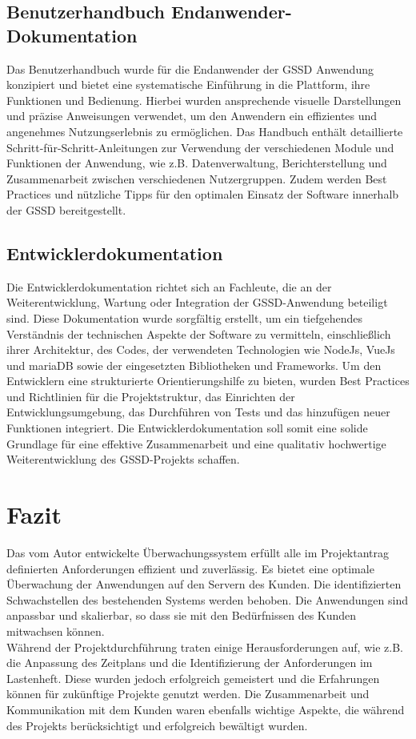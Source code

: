\begin{flushleft}
		\subsection{Benutzerhandbuch Endanwender-Dokumentation}

			Das Benutzerhandbuch wurde für die Endanwender der \acs{GSSD} Anwendung konzipiert und bietet eine systematische Einführung in die Plattform, ihre Funktionen und Bedienung. Hierbei wurden ansprechende visuelle Darstellungen und präzise Anweisungen verwendet, um den Anwendern ein effizientes und angenehmes Nutzungserlebnis zu ermöglichen. Das Handbuch enthält detaillierte Schritt-für-Schritt-Anleitungen zur Verwendung der verschiedenen Module und Funktionen der Anwendung, wie \acs{z.B.} Datenverwaltung, Berichterstellung und Zusammenarbeit zwischen verschiedenen Nutzergruppen. Zudem werden Best Practices und nützliche Tipps für den optimalen Einsatz der Software innerhalb der \acs{GSSD} bereitgestellt.

		\subsection{Entwicklerdokumentation}
			Die Entwicklerdokumentation richtet sich an Fachleute, die an der Weiterentwicklung, Wartung oder Integration der \acs{GSSD}-Anwendung beteiligt sind. Diese Dokumentation wurde sorgfältig erstellt, um ein tiefgehendes Verständnis der technischen Aspekte der Software zu vermitteln, einschließlich ihrer Architektur, des Codes, der verwendeten Technologien wie NodeJs, VueJs und \acs{mariaDB} sowie der eingesetzten Bibliotheken und Frameworks. Um den Entwicklern eine strukturierte Orientierungshilfe zu bieten, wurden Best Practices und Richtlinien für die Projektstruktur, das Einrichten der Entwicklungsumgebung, das Durchführen von Tests und das hinzufügen neuer Funktionen integriert. Die Entwicklerdokumentation soll somit eine solide Grundlage für eine effektive Zusammenarbeit und eine qualitativ hochwertige Weiterentwicklung des \acs{GSSD}-Projekts schaffen.


		\section{Fazit}
			Das vom Autor entwickelte Überwachungssystem erfüllt alle im Projektantrag definierten Anforderungen effizient und zuverlässig. Es bietet eine optimale Überwachung der Anwendungen auf den Servern des Kunden. Die identifizierten Schwachstellen des bestehenden Systems werden behoben. Die Anwendungen sind anpassbar und skalierbar, so dass sie mit den Bedürfnissen des Kunden mitwachsen können.
			\\
			Während der Projektdurchführung traten einige Herausforderungen auf, wie \acs{z.B.} die Anpassung des Zeitplans und die Identifizierung der Anforderungen im Lastenheft. Diese wurden jedoch erfolgreich gemeistert und die Erfahrungen können für zukünftige Projekte genutzt werden. Die Zusammenarbeit und Kommunikation mit dem Kunden waren ebenfalls wichtige Aspekte, die während des Projekts berücksichtigt und erfolgreich bewältigt wurden.


\end{flushleft}

